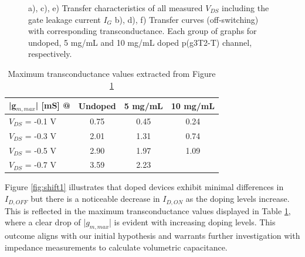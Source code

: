 \begin{figure}[!htb]
    \caption[Transfer characteristics and transconductance at different doping levels and $V_{DS}$]{a), c), e) Transfer characteristics of all measured $V_{DS}$ including the gate leakage current $I_{G}$ b), d), f) Transfer curves (off-switching) with corresponding transconductance. Each group of graphs for undoped, 5 mg/mL and 10 mg/mL doped p(g3T2-T) channel, respectively.}
    \label{fig:transx2}
\end{figure}

\begin{table}[ht]
\centering
\caption{Maximum transconductance values extracted from Figure \ref{fig:transx2}}
\begin{tabular}{l|c|c|c}
|g$_{m,max}$| [mS] @ & Undoped & 5 mg/mL & 10 mg/mL \\\hline
$V_{DS}$ = -0.1 V & 0.75 & 0.45 & 0.24\\
$V_{DS}$ = -0.3 V & 2.01 & 1.31 & 0.74\\
$V_{DS}$ = -0.5 V & 2.90 & 1.97 & 1.09\\
$V_{DS}$ = -0.7 V & 3.59 & 2.23 & \\ \hline
\end{tabular}
\label{tab:trans}
\end{table}

Figure \ref{fig:shift1} illustrates that doped devices exhibit minimal differences in $I_{D,OFF}$ but  there is a noticeable decrease in $I_{D,ON}$ as the doping levels increase. This is reflected in the maximum transconductance values displayed in Table \ref{tab:trans}, where a clear drop of |$g_{m,max}$| is evident with increasing doping levels. This outcome aligns with our initial hypothesis and warrants further investigation with impedance measurements to calculate volumetric capacitance. %

